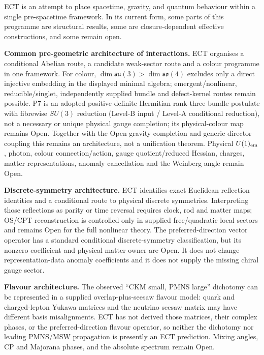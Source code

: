 \documentclass[11pt,a4paper]{article}
\begin{document}
ECT is an attempt to place spacetime, gravity, and quantum behaviour within a single pre-spacetime framework. In its current form, some parts of this programme are structural results, some are closure-dependent effective constructions, and some remain open.

\textbf{Common pre-geometric architecture of interactions.}
ECT organises a conditional Abelian route, a candidate weak-sector route and a colour programme in one framework. For colour, $\dim\mathfrak{su}(3)>\dim\mathfrak{so}(4)$ excludes only a direct injective embedding in the displayed minimal algebra; emergent/nonlinear, reducible/singlet, independently supplied bundle and defect-kernel routes remain possible. P7 is an adopted positive-definite Hermitian rank-three bundle postulate with fibrewise $SU(3)$ reduction (Level-B input / Level-A conditional reduction), not a necessary or unique physical gauge completion; its physical-colour map remains Open. Together with the Open gravity completion and generic director coupling this remains an architecture, not a unification theorem. Physical $U(1)_{\rm em}$, photon, colour connection/action, gauge quotient/reduced Hessian, charges, matter representations, anomaly cancellation and the Weinberg angle remain Open.

\textbf{Discrete-symmetry architecture.}
ECT identifies exact Euclidean reflection identities and a conditional route to physical discrete symmetries.  Interpreting those reflections as parity or time reversal requires clock, rod and matter maps; OS/CPT reconstruction is controlled only in supplied free/quadratic local sectors and remains Open for the full nonlinear theory.  The preferred-direction vector operator has a standard conditional discrete-symmetry classification, but its nonzero coefficient and physical matter owner are Open.  It does not change representation-data anomaly coefficients and it does not supply the missing chiral gauge sector.

\textbf{Flavour architecture.}
The observed ``CKM small, PMNS large'' dichotomy can be represented in a
supplied overlap-plus-seesaw flavour model: quark and charged-lepton Yukawa
matrices and the neutrino seesaw matrix may have different basis
misalignments.  ECT has not derived those matrices, their complex phases, or
the preferred-direction flavour operator, so neither the dichotomy nor
leading PMNS/MSW propagation is presently an ECT prediction.  Mixing angles,
CP and Majorana phases, and the absolute spectrum remain Open.
\end{document}
